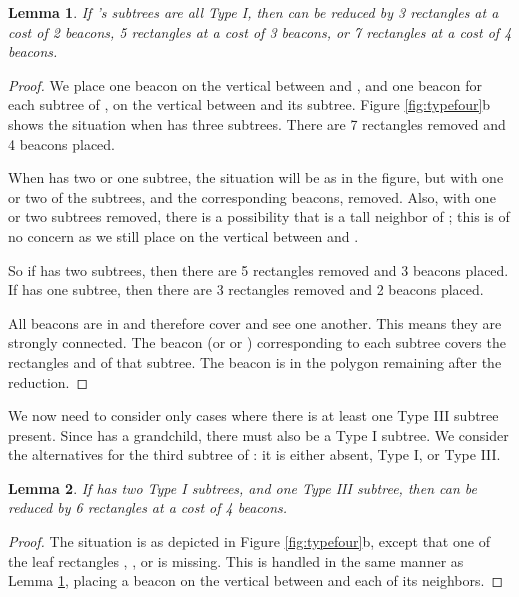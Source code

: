 \documentclass{article}
\newtheorem{lemma}{Lemma}
\begin{document}
		\begin{lemma}\label{lem:all-typeI}
		If 's subtrees are all Type I, then  can be reduced by 3 
			rectangles at a cost of 2 beacons, 5 rectangles at a cost of 3 beacons,
			or 7 rectangles at a cost of 4 beacons.
		\end{lemma}
		\begin{proof}
			We place one beacon  on the vertical between  and ,
			and one beacon for each subtree of , on the vertical between
			 and its subtree.  Figure \ref{fig:typefour}b shows the situation
			when  has three subtrees. There are 7 rectangles removed
			and 4 beacons placed.
			
			When  has two or one subtree, the situation will be as in the figure,
			but with one or two of the subtrees, and the corresponding beacons, removed.
			Also, with one or two subtrees removed, there is a possibility that  is
			a tall neighbor of ; this is of no concern as we still place  on the
			vertical between  and .
			
			So if  has two subtrees, then there are 5
			rectangles removed and 3 beacons placed.  If  has one subtree, then there are 3 rectangles
			removed and 2 beacons placed.
			
			All beacons are in  and therefore cover  and see one another.  This
			means they are strongly connected.  The beacon  (or  or )
			corresponding to each subtree covers the rectangles  and  of that
			subtree.
			The beacon  is in the polygon  remaining after the reduction.
		\end{proof}
		
		We now need to consider only cases where there is at least one Type III
		subtree present.  Since  has a grandchild, there must also be a Type I
		subtree.  We consider the alternatives for the third subtree of :  it is
		either absent, Type I, or Type III.
		
		\begin{lemma}
			If  has two Type I subtrees, and one Type III subtree, then 
			can be reduced by 6 rectangles at a cost of 4 beacons.
		\end{lemma}
		\begin{proof}
			The situation is as depicted in Figure \ref{fig:typefour}b, except that
			one of the leaf rectangles , , or  is missing.
			This is handled in the same manner as Lemma \ref{lem:all-typeI},
			placing a beacon on the vertical between  and each of its neighbors.
		\end{proof}
		
\end{document}

